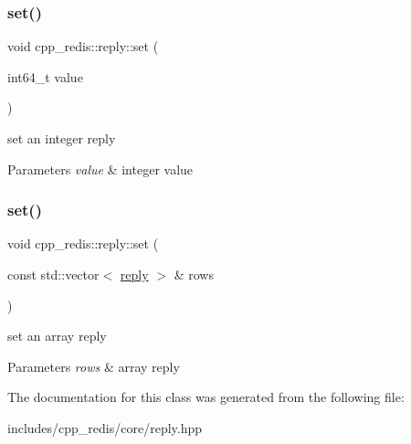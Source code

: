 \subsubsection{\texorpdfstring{set()}{set()}\hspace{0.1cm}{\footnotesize\ttfamily [3/4]}}
{\footnotesize\ttfamily void cpp\+\_\+redis\+::reply\+::set (\begin{DoxyParamCaption}\item[{int64\+\_\+t}]{value }\end{DoxyParamCaption})}

set an integer reply


\begin{DoxyParams}{Parameters}
{\em value} & integer value \\
\hline
\end{DoxyParams}
\mbox{\label{classcpp__redis_1_1reply_ab64ee3720832e60ed47b91fd5b3045bd}} 
\subsubsection{\texorpdfstring{set()}{set()}\hspace{0.1cm}{\footnotesize\ttfamily [4/4]}}
{\footnotesize\ttfamily void cpp\+\_\+redis\+::reply\+::set (\begin{DoxyParamCaption}\item[{const std\+::vector$<$ \mbox{\hyperlink{classcpp__redis_1_1reply}{reply}} $>$ \&}]{rows }\end{DoxyParamCaption})}

set an array reply


\begin{DoxyParams}{Parameters}
{\em rows} & array reply \\
\hline
\end{DoxyParams}


The documentation for this class was generated from the following file\+:\begin{DoxyCompactItemize}
\item 
includes/cpp\+\_\+redis/core/reply.\+hpp\end{DoxyCompactItemize}
